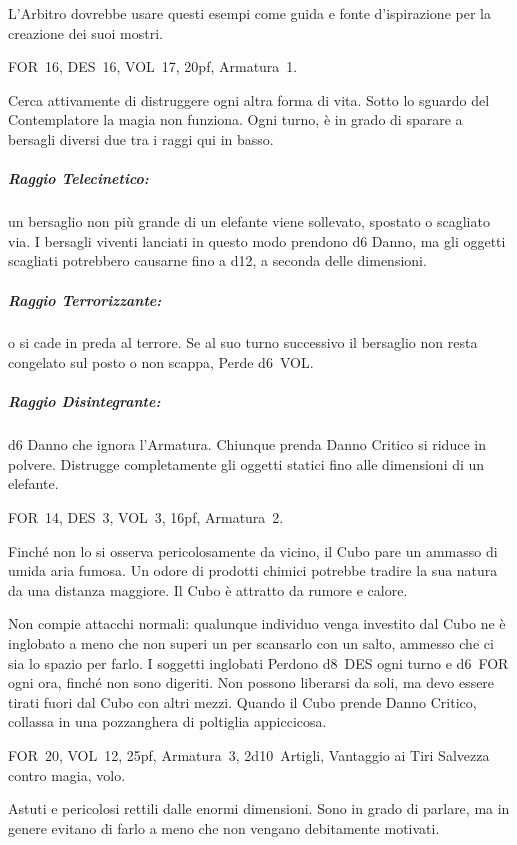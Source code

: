 \documentclass[itdr]{subfiles}
\begin{document}
\label{ch:appendice_b}

L'Arbitro dovrebbe usare questi esempi come guida e fonte d'ispirazione per la creazione dei suoi mostri.

\vfill

FOR~16, DES~16, VOL~17, 20pf, Armatura~1.

Cerca attivamente di distruggere ogni altra forma di vita. Sotto lo sguardo del Contemplatore la magia non funziona. Ogni turno, è in grado di sparare a bersagli diversi due tra i raggi qui in basso.

\subparagraph{Raggio Telecinetico:} un bersaglio non più grande di un elefante viene sollevato, spostato o scagliato via. I bersagli viventi lanciati in questo modo prendono d6 Danno, ma gli oggetti scagliati potrebbero causarne fino a d12, a seconda delle dimensioni.

\subparagraph{Raggio Terrorizzante:}  o si cade in preda al terrore. Se al suo turno successivo il bersaglio non resta congelato sul posto o non scappa, Perde d6~VOL.

\subparagraph{Raggio Disintegrante:} d6 Danno che ignora l'\mbox{Armatura}. Chiunque prenda Danno Critico si riduce in polvere. Distrugge completamente gli oggetti statici fino alle dimensioni di un elefante.

\vfill

FOR~14, DES~3, VOL~3, 16pf, Armatura~2.

Finché non lo si osserva pericolosamente da vicino, il Cubo pare un ammasso di umida aria fumosa. Un odore di prodotti chimici potrebbe tradire la sua natura da una distanza maggiore. Il Cubo è attratto da rumore e calore.

Non compie attacchi normali: qualunque individuo venga investito dal Cubo ne è inglobato a meno che non superi un  per scansarlo con un salto, ammesso che ci sia lo spazio per farlo. I soggetti inglobati Perdono d8~DES ogni turno e d6~FOR ogni ora, finché non sono digeriti. Non possono liberarsi da soli, ma devo essere tirati fuori dal Cubo con altri mezzi. Quando il Cubo prende Danno Critico, collassa in una pozzanghera di poltiglia appiccicosa.

\vfill

FOR~20, VOL~12, 25pf, Armatura~3, 2d10~Artigli, \mbox{Vantaggio} ai Tiri Salvezza contro magia, volo.

Astuti e pericolosi rettili dalle enormi dimensioni. Sono in grado di parlare, ma in genere evitano di farlo a meno che non vengano debitamente motivati.
\end{document}
